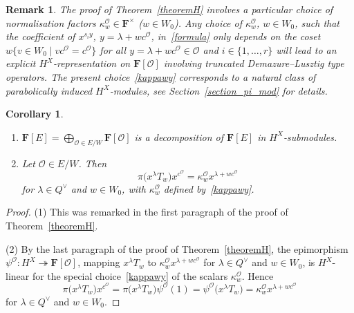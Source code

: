 \documentclass[11pt]{article}
\numberwithin{equation}{section}
\numberwithin{equation}{section}
\newtheorem{Corollary}[Theorem]{Corollary}
\newtheorem{Remark}[Theorem]{Remark} }
\begin{document}
\begin{Remark}\label{H_remark}
The proof of Theorem~\ref{theoremH} involves a particular choice of normalisation factors $\kappa_w^{\mathcal{O}}\in\mathbf{F}^\times$ ($w\in W_0$). Any choice of $\kappa_w^\mathcal{O}$, $w\in W_0$, such that the coefficient of $x^{s_iy}$, ${y=\lambda+wc^{\mathcal{O}}}$, in~\eqref{formula} only depends on the coset $w\{v\in W_0 \mid vc^\mathcal{O}=c^\mathcal{O}\}$ for all ${y=\lambda+wc^\mathcal{O}\in\mathcal{O}}$ and ${i\in\{1,\dots,r\}}$
will lead to an explicit $H^X$-representation on $\mathbf{F}[\mathcal{O}]$ involving truncated Demazure--Lusztig type operators. The present choice~\eqref{kappawy} corresponds to a natural class of parabolically induced $H^X$-modules,
see Section~\ref{section_pi_mod} for details.
\end{Remark}
\begin{Corollary}\label{corpsi}\hfill
\begin{enumerate}\itemsep=0pt
\item[$(1)$] $\mathbf{F}[E]=\bigoplus_{\mathcal{O}\in E/W}\mathbf{F}[\mathcal{O}]$ is a decomposition of $\mathbf{F}[E]$ in $H^X$-submodules.
\item[$(2)$] Let $\mathcal{O}\in E/W$. Then
\begin{equation*}%
\pi\bigl(x^\lambda T_w\bigr)x^{c^\mathcal{O}}=\kappa_w^\mathcal{O}x^{\lambda+wc^\mathcal{O}}
\end{equation*}
for $\lambda\in Q^\vee$ and $w\in W_0$,
with $\kappa_w^\mathcal{O}$ defined by~\eqref{kappawy}.
\end{enumerate}
\end{Corollary}

 \begin{proof}
 (1) This was remarked in the first paragraph of the proof of Theorem~\ref{theoremH}.

(2) By the last paragraph of the proof of Theorem~\ref{theoremH}, the epimorphism $\psi^\mathcal{O}\colon H^X\twoheadrightarrow\mathbf{F}[\mathcal{O}]$, mapping
$x^\lambda T_w$ to $\kappa_w^\mathcal{O}x^{\lambda+wc^\mathcal{O}}$ for $\lambda\in Q^\vee$ and $w\in W_0$, is $H^X$-linear for the special choice~\eqref{kappawy} of the scalars $\kappa_w^\mathcal{O}$. Hence
\[
\pi\bigl(x^\lambda T_w\bigr)x^{c^\mathcal{O}}=\pi\bigl(x^\lambda T_w\bigr)\psi^\mathcal{O}(1)=\psi^\mathcal{O}\bigl(x^\lambda T_w\bigr)=
\kappa_w^\mathcal{O}x^{\lambda+wc^\mathcal{O}}
\]
for $\lambda\in Q^\vee$ and $w\in W_0$.
 \end{proof}
\end{document}
